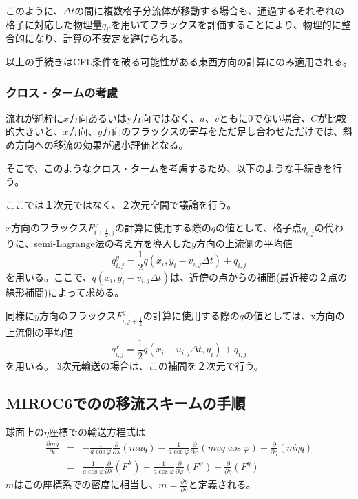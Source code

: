 \documentclass{jsbook}
\begin{document}
  このように、$\Delta t$の間に複数格子分流体が移動する場合も、通過するそれぞれの格子に対応した物理量$q_{i'}$を用いてフラックスを評価することにより、物理的に整合的になり、計算の不安定を避けられる。

  以上の手続きはCFL条件を破る可能性がある東西方向の計算にのみ適用される。

  \subsubsection{クロス・タームの考慮}
  流れが純粋に$x$方向あるいはy方向ではなく、$u、v$ともに0でない場合、$C$が比較的大きいと、$x$方向、$y$方向のフラックスの寄与をただ足し合わせただけでは、斜め方向への移流の効果が過小評価となる。

  そこで、このようなクロス・タームを考慮するため、以下のような手続きを行う。

  ここでは１次元ではなく、２次元空間で議論を行う。
  
  $x$方向のフラックス$F^{x}_{i+\frac{1}{2},j}$の計算に使用する際の$q$の値として、格子点$q_{i,j}$の代わりに、semi-Lagrange法の考え方を導入した$y$方向の上流側の平均値
  \begin{equation}
    q^{y}_{i,j}=\frac{1}{2} {q(x_{i},y_{i}-v_{i,j}\Delta t)+q_{i,j}}
  \end{equation}
  を用いる。ここで、$q(x_{i},y_{i}-v_{i,j}\Delta t)$は、近傍の点からの補間(最近接の２点の線形補間)によって求める。

  同様に$y$方向のフラックス$F^{y}_{i,j+\frac{1}{2}}$の計算に使用する際の$q$の値としては、x方向の上流側の平均値
  \begin{equation}
    q^{x}_{i,j}=\frac{1}{2} {q(x_{i}-u_{i,j}\Delta t,y_{i})+q_{i,j}}
  \end{equation}
  を用いる。
  3次元輸送の場合は、この補間を２次元で行う。

  
\subsection{MIROC6でのの移流スキームの手順}
球面上の$\eta$座標での輸送方程式は
\begin{eqnarray}
  \frac{\partial mq}{\partial t} &=& - \frac{1}{a \cos \varphi} \frac{\partial}{\partial \lambda}(muq)- \frac{1}{a \cos \varphi} \frac{\partial}{\partial \varphi}(mvq \cos \varphi)- \frac{\partial}{\partial \eta} (m \dot{\eta} q)\\
  &=& \frac{1}{a \cos \varphi} \frac{\partial}{\partial \lambda}(F^{\lambda})- \frac{1}{a \cos \varphi} \frac{\partial}{\partial \varphi}(F^{\varphi})- \frac{\partial}{\partial \eta} (F^{\eta})
\end{eqnarray}
$m$はこの座標系での密度に相当し、$m=\frac{\partial p}{\partial \eta}$と定義される。
\end{document}
